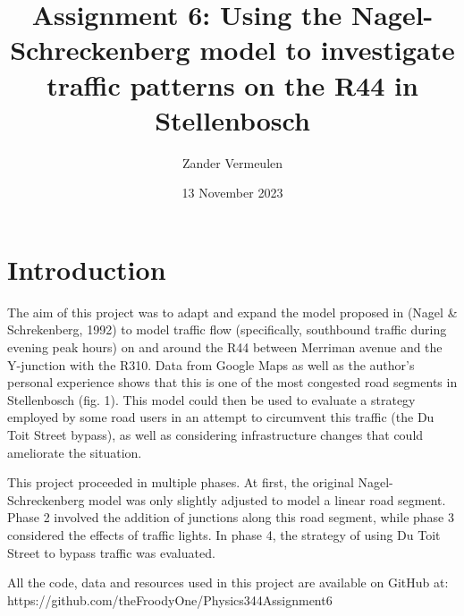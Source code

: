 \documentclass{article}
\title{Assignment 6: Using the Nagel-Schreckenberg model to investigate traffic patterns on the R44 in Stellenbosch}
\author{Zander Vermeulen}
\date{13 November 2023}
\begin{document}
\maketitle

\section*{Introduction}

The aim of this project was to adapt and expand the model proposed in (Nagel \& Schrekenberg, 1992) to model traffic flow (specifically, southbound traffic during evening peak hours) on and around the R44 between Merriman avenue and the Y-junction with the R310. Data from Google Maps as well as the author's personal experience shows that this is one of the most congested road segments in Stellenbosch (fig. 1). This model could then be used to evaluate a strategy employed by some road users in an attempt to circumvent this traffic (the Du Toit Street bypass), as well as considering infrastructure changes that could ameliorate the situation.

This project proceeded in multiple phases. At first, the original Nagel-Schreckenberg model was only slightly adjusted to model a linear road segment. Phase 2 involved the addition of junctions along this road segment, while phase 3 considered the effects of traffic lights. In phase 4, the strategy of using Du Toit Street to bypass traffic was evaluated.

All the code, data and resources used in this project are available on GitHub at: https://github.com/theFroodyOne/Physics344Assignment6
\end{document}
